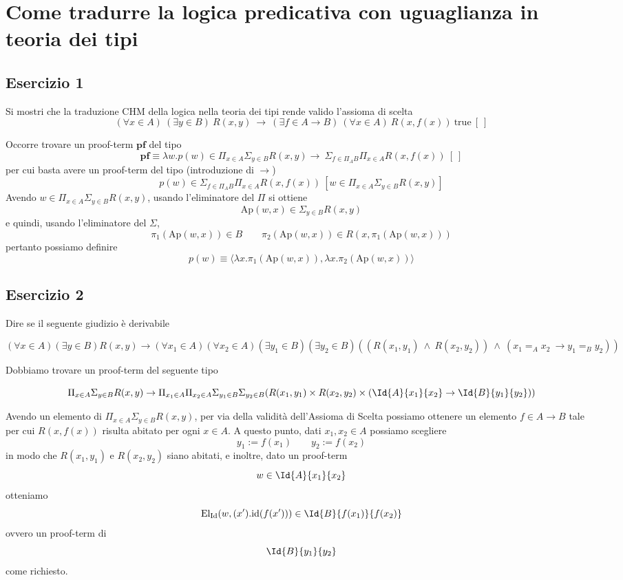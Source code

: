 \newpage
\section{Come tradurre la logica predicativa con uguaglianza in teoria dei tipi}
\subsection{Esercizio 1}
\begin{thm} Si mostri che la traduzione CHM della logica nella teoria dei tipi rende valido l'assioma di scelta
	\[ (\forall x\in A)\ (\exists y\in B)\  R(x, y)\ \to\ (\exists f\in A\to B)\ (\forall x\in A)\ R(x, f(x))\ \mathrm{true}\ [\ ] \]
	
\end{thm}

\proof
Occorre trovare un proof-term $\textbf{pf}$ del tipo
\[\textbf{pf} \equiv \lambda w.p(w) \in \Pi_{x\in A}\Sigma_{y\in B}R(x,y)\to\ \Sigma_{f\in {\Pi_A B}}\Pi_{x\in A}R(x, f(x))\ [\ ] \]
per cui basta avere un proof-term del tipo (introduzione di $\to$)
\[ p(w) \in \Sigma_{f\in {\Pi_A B}}\Pi_{x\in A}R(x, f(x))\ [w\in \Pi_{x\in A}\Sigma_{y\in B}R(x,y) ] \]
Avendo $w\in \Pi_{x\in A}\Sigma_{y\in B}R(x,y)$, usando l'eliminatore del $\Pi$ si ottiene 
\[ \mathrm{Ap}(w, x)\in \Sigma_{y\in B}R(x,y) \]
e quindi, usando l'eliminatore del $\Sigma$,
\[ \pi_1(\mathrm{Ap}(w,x))\in B \qquad \pi_2(\mathrm{Ap}(w,x))\in R(x, \pi_1(\mathrm{Ap}(w, x)))\]
pertanto possiamo definire
\[ p(w) \equiv \langle \lambda x. \pi_1(\mathrm{Ap}(w, x)), \lambda x.\pi_2(\mathrm{Ap}(w, x))\rangle \]
\endproof

\subsection{Esercizio 2}
\begin{thm}
	Dire se il seguente giudizio è derivabile
	\begin{scriptsize}
		\[(\forall x \in A)(\exists y \in B)R(x, y) \to (\forall x_1\in A)(\forall x_2\in A)(\exists y_1\in B)(\exists y_2\in B)(( R(x_1, y_1)\ \wedge\ R(x_2, y_2))\ \wedge\  (x_1 =_A x_2\ \to y_1 =_B y_2))\]
	\end{scriptsize}
\end{thm}
\proof
Dobbiamo trovare un proof-term del seguente tipo
\begin{scriptsize}
	\[ \Pi_{x\in A}\Sigma_{y\in B}R(x, y) \to \Pi_{x_1\in A}\Pi_{x_2\in A}\Sigma_{y_1\in B}\Sigma_{y_2\in B}(R(x_1, y_1)\times R(x_2, y_2)\times (\Id{A}{x_1}{x_2} \to \Id{B}{y_1}{y_2}))\]
\end{scriptsize}
Avendo un elemento di $\Pi_{x\in A}\Sigma_{y\in B}R(x,y)$, per via della validità dell'Assioma di Scelta possiamo ottenere un elemento $f \in A \to B$ tale per cui $R(x, f(x))$ risulta abitato per ogni $x \in A$. A questo punto, dati $x_1, x_2 \in A$ possiamo scegliere
\[ y_1 := f(x_1) \qquad y_2 := f(x_2) \]
in modo che $R(x_1, y_1)$ e $R(x_2, y_2)$ siano abitati, e inoltre, dato un proof-term
\[ w \in \Id{A}{x_1}{x_2}\]
otteniamo
\[ \mathrm{El}_{\mathrm{Id}}(w, (x').\mathrm{id}(f(x'))) \in \Id{B}{f(x_1)}{f(x_2)}\] ovvero un proof-term di 
\[ \Id{B}{y_1}{y_2} \]
come richiesto.
\endproof

